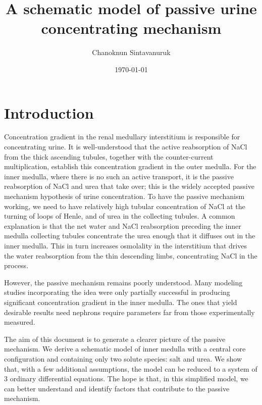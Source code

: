\documentclass{article}
\title{A schematic model of passive urine concentrating mechanism}
\author[1]{Chanoknun Sintavanuruk}
\date{\today}
\numberwithin{equation}{section} %
\begin{document}
\sloppy %
\maketitle

\section{Introduction}

Concentration gradient in the renal medullary interstitium is responsible for concentrating urine.
It is well-understood that the active reabsorption of NaCl from the thick ascending tubules, together with the counter-current multiplication, establish this concentration gradient in the outer medulla.
For the inner medulla, where there is no such an active transport, it is the passive reabsorption of NaCl and urea that take over; this is the widely accepted passive mechanism hypothesis of urine concentration.
To have the passive mechanism working, we need to have relatively high tubular concentration of NaCl at the turning of loops of Henle, and of urea in the collecting tubules.
A common explanation is that the net water and NaCl reabsorption preceding the inner medulla collecting tubules concentrate the urea enough that it diffuses out in the inner medulla.
This in turn increases osmolality in the interstitium that drives the water reabsorption from the thin descending limbs, concentrating NaCl in the process.

However, the passive mechanism remains poorly understood.
Many modeling studies incorporating the idea were only partially successful in producing significant concentration gradient in the inner medulla.
The ones that yield desirable results need nephrons require parameters far from those experimentally measured.

The aim of this document is to generate a clearer picture of the passive mechanism.
We derive a schematic model of inner medulla with a central core configuration and containing only two solute species: salt and urea.
We show that, with a few additional assumptions, the model can be reduced to a system of 3 ordinary differential equations.
The hope is that, in this simplified model, we can better understand and identify factors that contribute to the passive mechanism.
\end{document}
